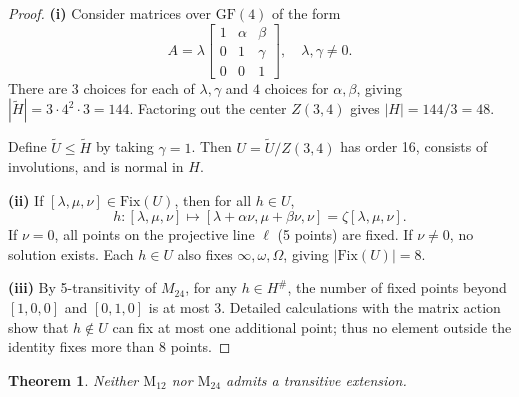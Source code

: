 \documentclass[12pt,a4paper,openany]{book}
\newtheorem{theorem}{Theorem}[section]
\newcommand{\GF}{\mathrm{GF}}
\newcommand{\Fix}{\mathrm{Fix}}
\begin{document}
\begin{proof}
\textbf{(i)} Consider matrices over $\GF(4)$ of the form
\[
A = \lambda \begin{bmatrix} 1 & \alpha & \beta \\ 0 & 1 & \gamma \\ 0 & 0 & 1 \end{bmatrix}, \quad \lambda, \gamma \neq 0.
\] 
There are $3$ choices for each of $\lambda, \gamma$ and $4$ choices for $\alpha, \beta$, giving $|\widetilde{H}| = 3 \cdot 4^2 \cdot 3 = 144$. Factoring out the center $Z(3,4)$ gives $|H| = 144/3 = 48$.  

Define $\widetilde{U} \le \widetilde{H}$ by taking $\gamma=1$. Then $U = \widetilde{U}/Z(3,4)$ has order 16, consists of involutions, and is normal in $H$.

\medskip
\textbf{(ii)} If $[\lambda,\mu,\nu] \in \Fix(U)$, then for all $h \in U$,
\[
h: [\lambda, \mu, \nu] \mapsto [\lambda + \alpha \nu, \mu + \beta \nu, \nu] = \zeta [\lambda,\mu,\nu].
\] 
If $\nu=0$, all points on the projective line $\ell$ (5 points) are fixed. If $\nu \neq 0$, no solution exists. Each $h \in U$ also fixes $\infty, \omega, \Omega$, giving $|\Fix(U)| = 8$.

\medskip
\textbf{(iii)} By 5-transitivity of $M_{24}$, for any $h \in H^\#$, the number of fixed points beyond $[1,0,0]$ and $[0,1,0]$ is at most 3. Detailed calculations with the matrix action show that $h \notin U$ can fix at most one additional point; thus no element outside the identity fixes more than 8 points.
\end{proof}


\begin{theorem}\label{thm:no-transitive-extension}
Neither $\mathrm{M}_{12}$ nor $\mathrm{M}_{24}$ admits a transitive extension.
\end{theorem}
\end{document}
